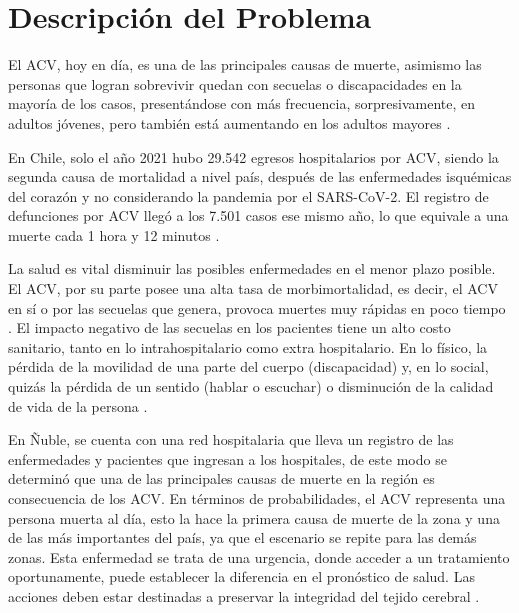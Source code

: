 \doublespacing
\section{Descripción del Problema}
El ACV, hoy en día, es una de las principales causas de muerte, asimismo las personas que logran sobrevivir quedan con secuelas o discapacidades en la mayoría de los casos, presentándose con más frecuencia, sorpresivamente, en adultos jóvenes, pero también está aumentando en los adultos mayores \cite{Ortiz-Galeano2020}. \\
\par En Chile, solo el año 2021 hubo 29.542 egresos hospitalarios por ACV, siendo la segunda causa de mortalidad a nivel país, después de las enfermedades isquémicas del corazón y no considerando la pandemia por el SARS-CoV-2. El registro de defunciones por ACV llegó a los 7.501 casos ese mismo año, lo que equivale a una muerte cada 1 hora y 12 minutos \cite{Minsal2022}.\\
\par La salud es vital disminuir las posibles enfermedades en el menor plazo posible. El ACV, por su parte posee una alta tasa de morbimortalidad, es decir, el ACV en sí o por las secuelas que genera, provoca muertes muy rápidas en poco tiempo \cite{Gaudiano2019}. El impacto negativo de las secuelas en los pacientes tiene un alto costo sanitario, tanto en lo intrahospitalario como extra hospitalario. En lo físico, la pérdida de la movilidad de una parte del cuerpo (discapacidad) y, en lo social, quizás la pérdida de un sentido (hablar o escuchar) o disminución de la calidad de vida de la persona \cite{Cabrera2020}.\\
\par En Ñuble, se cuenta con una red hospitalaria que lleva un registro de las enfermedades y pacientes que ingresan a los hospitales, de este modo se determinó que una de las principales causas de muerte en la región es consecuencia de los ACV. En términos de probabilidades, el ACV representa una persona muerta al día, esto la hace la primera causa de muerte de la zona y una de las más importantes del país, ya que el escenario se repite para las demás zonas. Esta enfermedad se trata de una urgencia, donde acceder a un tratamiento oportunamente, puede establecer la diferencia en el pronóstico de salud. Las acciones deben estar destinadas a preservar la integridad del tejido cerebral \cite{ServicioSaludNuble}.\\

